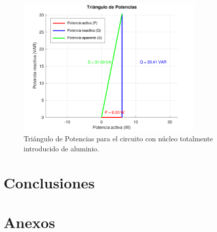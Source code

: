 \documentclass{article}
\begin{document}
            \begin{figure}[H]
                \centering
                \includegraphics[width=0.8\textwidth]{graficoTotalAluminio.png}
                \caption{Triángulo de Potencias para el circuito con núcleo totalmente introducido de aluminio.}
                \label{fig:graficoTotalAluminio}
            \end{figure}
   
            
            
            
    \section{Conclusiones}

    \section{Anexos}
\end{document}
